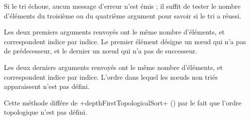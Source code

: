 Si le tri échoue, aucun message d'erreur n'est émis ; il suffit de tester le nombre d'éléments du troisième ou du quatrième argument pour savoir si le tri a réussi.

Les deux premiers arguments renvoyés ont le même nombre d'éléments, et correspondent indice par indice. Le premier élément désigne un nœud qui n'a pas de prédecesseur, et le dernier un nœud qui n'a pas de successeur.


Les deux derniers arguments renvoyés ont le même nombre d'éléments, et correspondent indice par indice. L'ordre dans lequel les nœuds non triés apparaissent n'est pas défini.

Cette méthode différe de \ggst+depthFirstTopologicalSort+ () par le fait que  l'ordre topologique n'est pas défini.

